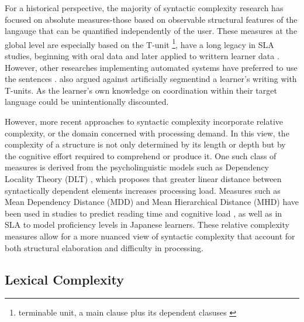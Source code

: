For a historical perspective, the majority of syntactic complexity research has focused on absolute measures-those 
based on observable structural features of the langauge that can be quantified independently of the user. These 
measures at the global level are especially based on the T-unit
\footnote{terminable unit, a main clause plus its dependent clasuses
\cite{hunt1965}}, have a long legacy in SLA studies, beginning with oral data \cite{hunt1965} and later applied to
writtern learner data \cite{Ortega2003,Lu2011}. However, other researches implementing automated systems have
preferred to use the sentences \cite{Vyatkina2012,Lu2010}. \citet{Bardovi-Harlig1992} also argued against
artificially segmentind a learner's writing with T-units. As the learner's own knowledge on coordination within
their target language could be unintentionally discounted.

However, more recent approaches to syntactic complexity incorporate relative complexity, or the domain concerned
with processing demand. In this view, the complexity of a structure is not only determined by its length or depth
but by the cognitive effort required to comprehend or produce it. One such class of measures is derived from the 
psycholinguistic models such as Dependency Locality Theory (DLT) \cite{Gibson2000}, which proposes that greater linear distance 
between syntactically dependent elements increases processing load. Measures such as Mean Dependency Distance (MDD)\cite{Liu2008} and Mean Hierarchical Distance (MHD) \cite{Liu2017} have been used in studies to predict reading time and cognitive load \cite{shain2016, Feng2009}, as well as in SLA to model proficiency levels in Japanese learners\cite{Jiang2019,komori2019,Yang2023}. These relative complexity measures allow for a more nuanced view of syntactic complexity that account for both structural elaboration and difficulty in processing. %


\subsection{Lexical Complexity}

